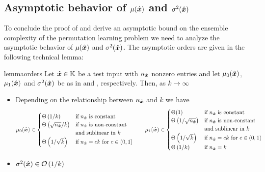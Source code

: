 \subsection{Asymptotic behavior of $\mu(\hat{\boldsymbol{x}})$ and $\sigma^2(\hat{\boldsymbol{x}})$}

To conclude the proof of  and derive an asymptotic bound on the ensemble complexity of the permutation learning problem we need to analyze the asymptotic behavior of $\mu(\hat{\boldsymbol{x}})$ and $\sigma^2(\hat{\boldsymbol{x}})$. The asymptotic orders are given in the following technical lemma:

\begin{restatable}{lemma}{orders}
\label{lemm:orders}
    Let $\hat{\boldsymbol{x}} \in \mathbb{K}$ be a test input with $n_{\hat{\boldsymbol{x}}}$ nonzero entries and let $\mu_0(\hat{\boldsymbol{x}})$, $\mu_1(\hat{\boldsymbol{x}})$ and $\sigma^2(\hat{\boldsymbol{x}})$ be as in  and , respectively. Then, as $k \to \infty$
    \begin{itemize}
        \item Depending on the relationship between  $n_{\hat{\boldsymbol{x}}}$ and $k$ we have
        $$
         \mu_0(\hat{\boldsymbol{x}}) \in 
        \begin{cases}
            \Theta\left(1/k\right) & \text{if}\; n_{\hat{\boldsymbol{x}}} \text{ is constant} \\
            \Theta\left(\sqrt{n_{\hat{\boldsymbol{x}}}}/k\right) &\text{if}\; n_{\hat{\boldsymbol{x}}} \text{ is non-constant}\\ &\text{and sublinear in } k \\
            \Theta\left(1/\sqrt{k}\right) & \text{if}\; n_{\hat{\boldsymbol{x}}} = ck \text{ for } c \in (0, 1]
        \end{cases} \qquad
         \mu_1(\hat{\boldsymbol{x}}) \in \begin{cases}
            \Theta(1) & \text{if}\; n_{\hat{\boldsymbol{x}}} \text{ is constant} \\
            \Theta\left(1/\sqrt{n_{\hat{\boldsymbol{x}}}}\right) & \text{if}\; n_{\hat{\boldsymbol{x}}} \text{ is non-constant}\\ &\text{and sublinear in } k\\
            \Theta\left(1/\sqrt{k}\right) & \text{if}\; n_{\hat{\boldsymbol{x}}} = ck \text{ for } c\in(0,1) \\ 
            \Theta\left(1/k\right) & \text{if}\; n_{\hat{\boldsymbol{x}}}=k
        \end{cases}
        $$
        \item $\sigma^2(\hat{\boldsymbol{x}}) \in \mathcal{O}\left(1/k\right)$
    \end{itemize}
\end{restatable}

